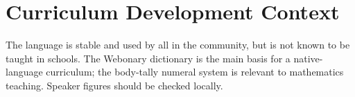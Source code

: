 \documentclass[12pt]{article}
\begin{document}
\section{Curriculum Development Context}
The language is stable and used by all in the community, but is not known to be taught in schools. The Webonary dictionary is the main basis for a native-language curriculum; the body-tally numeral system is relevant to mathematics teaching. Speaker figures should be checked locally.
\end{document}
